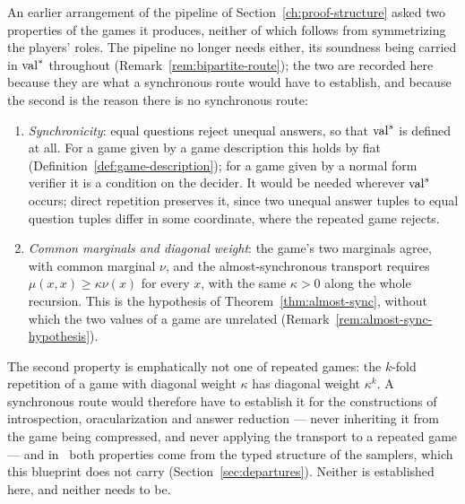 \begin{remark}
\label{rem:sync-invariant}
An earlier arrangement of the pipeline of Section~\ref{ch:proof-structure} asked two
properties of the games it produces, neither of which follows from symmetrizing the
players' roles. The pipeline no longer needs either, its soundness being carried in
$\mathrm{val}^*$ throughout (Remark~\ref{rem:bipartite-route}); the two are recorded here
because they are what a synchronous route would have to establish, and because the second
is the reason there is no synchronous route:
\begin{enumerate}
\item \emph{Synchronicity}: equal questions reject unequal answers, so that $\mathrm{val}^{s}$ is
  defined at all. For a game given by a game description this holds by fiat
  (Definition~\ref{def:game-description}); for a game given by a normal form verifier it
  is a condition on the decider. It would be needed wherever $\mathrm{val}^{s}$ occurs; direct
  repetition preserves it, since two unequal answer tuples to equal question tuples differ
  in some coordinate, where the repeated game rejects.
\item \emph{Common marginals and diagonal weight}: the game's two marginals agree,
  with common marginal $\nu$, and the almost-synchronous transport requires
  $\mu(x,x)\geq\kappa\nu(x)$ for every $x$, with the same
  $\kappa > 0$ along the whole recursion. This is the hypothesis of
  Theorem~\ref{thm:almost-sync}, without which the two values of a game are unrelated
  (Remark~\ref{rem:almost-sync-hypothesis}).
\end{enumerate}
The second property is emphatically not one of repeated games: the $k$-fold repetition of
a game with diagonal weight $\kappa$ has diagonal weight $\kappa^k$. A synchronous route
would therefore have to establish it for the constructions of introspection,
oracularization and answer reduction --- never inheriting it from the game being
compressed, and never applying the transport to a repeated game --- and in~\cite{JNVWY20}
both properties come from the typed structure of the samplers, which this blueprint does
not carry (Section~\ref{sec:departures}). Neither is established here, and neither needs
to be.
\end{remark}

